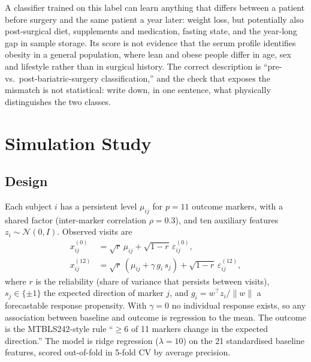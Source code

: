 \documentclass[conference]{IEEEtran}
\begin{document}
A classifier trained on this label can learn anything that differs between a
patient before surgery and the same patient a year later: weight loss, but
potentially also post-surgical diet, supplements and medication, fasting
state, and the year-long gap in sample storage. Its score is not evidence that the serum
profile identifies obesity in a general population, where lean and obese
people differ in age, sex and lifestyle rather than in surgical history. The
correct description is ``pre- vs.\ post-bariatric-surgery classification,''
and the check that exposes the mismatch is not statistical: write down, in one
sentence, what physically distinguishes the two classes.

\section{Simulation Study}
\label{sec:sim}

\subsection{Design}
Each subject $i$ has a persistent level $\mu_{ij}$ for $p=11$ outcome markers,
with a shared factor (inter-marker correlation $\rho=0.3$), and ten auxiliary
features $z_i\sim\mathcal{N}(0,I)$. Observed visits are
\begin{align}
x^{(0)}_{ij} &= \sqrt{r}\,\mu_{ij} + \sqrt{1-r}\,\varepsilon^{(0)}_{ij},\\
x^{(12)}_{ij} &= \sqrt{r}\,(\mu_{ij} + \gamma\, g_i\, s_j) + \sqrt{1-r}\,\varepsilon^{(12)}_{ij},
\end{align}
where $r$ is the reliability (share of variance that persists between
visits), $s_j\in\{\pm1\}$ the expected direction of marker $j$, and
$g_i = w^\top z_i/\lVert w\rVert$ a forecastable response propensity. With
$\gamma=0$ no individual response exists, so any association between baseline
and outcome is regression to the mean. The outcome is the MTBLS242-style rule
``$\geq$6 of 11 markers change in the expected direction.'' The model is
ridge regression ($\lambda=10$) on the 21 standardised baseline features,
scored out-of-fold in 5-fold CV by average precision.
\end{document}
